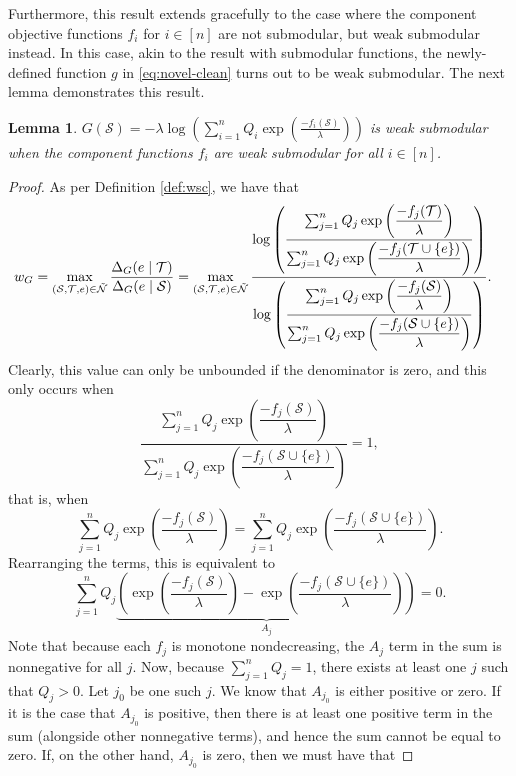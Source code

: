 \documentclass[letter,11pt]{article}
\newtheorem{lemma}[]{Lemma}
\def\lp{\left(}
\def\rp{\right)}
\def\sS{\mathcal{S}}
\def\sN{\mathcal{N}}
\def\sT{\mathcal{T}}
\begin{document}
Furthermore, this result extends gracefully to the case where the component objective functions $f_i$ for $i \in [n]$ are not submodular, but weak submodular instead. In this case, akin to the result with submodular functions, the newly-defined function $g$ in \eqref{eq:novel-clean} turns out to be weak submodular. The next lemma demonstrates this result.
\begin{lemma}
$G(\sS) = -\lambda\log(\sum_{i=1}^nQ_i\exp{(\frac{-f_i(\sS)}{\lambda})})$ is weak submodular when the component functions $f_i$ are weak submodular for all $i \in [n]$.
\end{lemma}
\begin{proof}
As per Definition \ref{def:wsc}, we have that
\begin{equation}
\begin{split}
w_G &= \max_{(\sS, \sT, e) \in \Tilde{\sN}} \dfrac{\Delta_G(e\mid \sT)}{\Delta_G(e\mid \sS)}=\max_{(\sS, \sT, e) \in \Tilde{\sN}} \dfrac{\log \lp \dfrac{\sum_{j=1}^n Q_j \exp\lp\dfrac{-f_j(\sT)}{\lambda}\rp}{\sum_{j=1}^n Q_j \exp\lp\dfrac{-f_j(\sT\cup \{e\})}{\lambda}\rp}\rp}{\log \lp \dfrac{\sum_{j=1}^n Q_j \exp\lp\dfrac{-f_j(\sS)}{\lambda}\rp}{\sum_{j=1}^n Q_j \exp\lp\dfrac{-f_j(\sS\cup \{e\})}{\lambda}\rp}\rp}.
\end{split}
\end{equation}
Clearly, this value can only be unbounded if the denominator is zero, and this only occurs when
\begin{equation}
\dfrac{\sum_{j=1}^n Q_j \exp\lp\dfrac{-f_j(\sS)}{\lambda}\rp}{\sum_{j=1}^n Q_j \exp\lp\dfrac{-f_j(\sS\cup \{e\})}{\lambda}\rp} = 1,
\end{equation}
that is, when
\begin{equation}
\sum_{j=1}^n Q_j \exp\lp\dfrac{-f_j(\sS)}{\lambda}\rp = \sum_{j=1}^n Q_j \exp\lp\dfrac{-f_j(\sS\cup \{e\})}{\lambda}\rp.
\end{equation}
Rearranging the terms, this is equivalent to
\begin{equation}\label{eq:impossible}
\sum_{j=1}^n Q_j \underbrace{\lp \exp \lp \dfrac{-f_j(\sS)}{\lambda}\rp - \exp \lp \dfrac{-f_j(\sS \cup \{e\})}{\lambda} \rp \rp}_{A_j} = 0.
\end{equation}
Note that because each $f_j$ is monotone nondecreasing, the $A_j$ term in the sum is nonnegative for all $j$. Now, because $\sum_{j=1}^n Q_j = 1$, there exists at least one $j$ such that $Q_j >0$. Let $j_0$ be one such $j$. We know that $A_{j_0}$ is either positive or zero. If it is the case that $A_{j_0}$ is positive, then there is at least one positive term in the sum (alongside other nonnegative terms), and hence the sum cannot be equal to zero. If, on the other hand, $A_{j_0}$ is zero, then we must have that

\end{proof}
\end{document}
